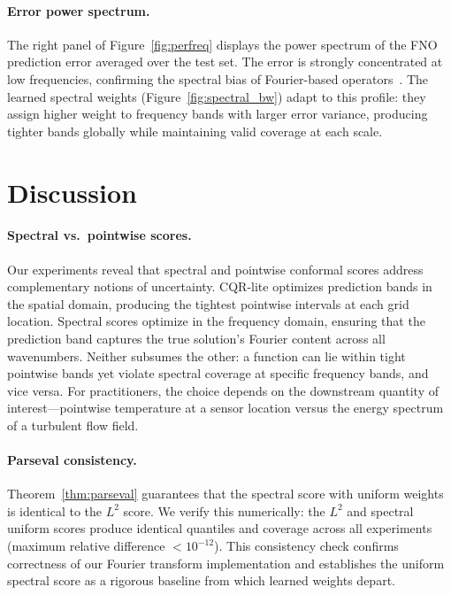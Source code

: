 \paragraph{Error power spectrum.}
The right panel of Figure~\ref{fig:perfreq} displays the power spectrum of the FNO prediction error averaged over the test set. The error is strongly concentrated at low frequencies, confirming the spectral bias of Fourier-based operators~\citep{rahaman2019spectral,fanaskov2023spectral}. The learned spectral weights (Figure~\ref{fig:spectral_bw}) adapt to this profile: they assign higher weight to frequency bands with larger error variance, producing tighter bands globally while maintaining valid coverage at each scale.


\section{Discussion}
\label{sec:discussion}

\paragraph{Spectral vs.\ pointwise scores.}
Our experiments reveal that spectral and pointwise conformal scores address complementary notions of uncertainty. CQR-lite optimizes prediction bands in the spatial domain, producing the tightest pointwise intervals at each grid location. Spectral scores optimize in the frequency domain, ensuring that the prediction band captures the true solution's Fourier content across all wavenumbers. Neither subsumes the other: a function can lie within tight pointwise bands yet violate spectral coverage at specific frequency bands, and vice versa. For practitioners, the choice depends on the downstream quantity of interest---pointwise temperature at a sensor location versus the energy spectrum of a turbulent flow field.

\paragraph{Parseval consistency.}
Theorem~\ref{thm:parseval} guarantees that the spectral score with uniform weights is identical to the $L^2$ score. We verify this numerically: the $L^2$ and spectral uniform scores produce identical quantiles and coverage across all experiments (maximum relative difference $< 10^{-12}$). This consistency check confirms correctness of our Fourier transform implementation and establishes the uniform spectral score as a rigorous baseline from which learned weights depart.

